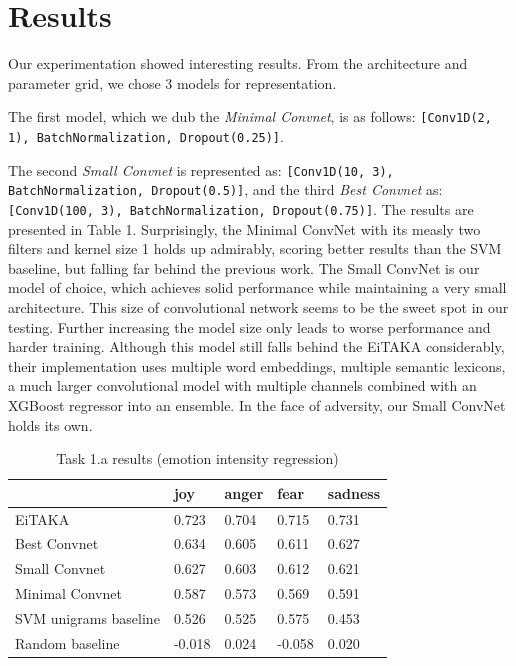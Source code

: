\documentclass[10pt, a4paper]{article}
\begin{document}

\section{Results}
Our experimentation showed interesting results. 
From the architecture and parameter grid, we chose 3 models for representation.

The first model, which we dub the \textit{Minimal Convnet}, is as follows:
\texttt{[Conv1D(2, 1), BatchNormalization, Dropout(0.25)]}.

The second \textit{Small Convnet} is represented as: 
\texttt{[Conv1D(10, 3), BatchNormalization, Dropout(0.5)]}, and the third 
\textit{Best Convnet} as: 
\texttt{[Conv1D(100, 3), BatchNormalization, Dropout(0.75)]}.
The results are presented in Table 1.
Surprisingly, the Minimal ConvNet with its measly two filters 
and kernel size 1 holds up admirably, scoring
better results than the SVM baseline, but falling far behind the 
previous work.
The Small ConvNet is our model of choice, which achieves solid 
performance while maintaining a very small architecture.
This size of convolutional network seems to be the sweet spot in our testing.
Further increasing the model size only leads to worse performance and 
harder training.
Although this model still falls behind the EiTAKA considerably, their
implementation uses multiple word embeddings, multiple semantic lexicons,
a much larger convolutional model with multiple channels combined with an
XGBoost regressor into an ensemble.
In the face of adversity, our Small ConvNet holds its own.


\begin{table}
\caption{Task 1.a results (emotion intensity regression)}
\label{tab:narrow-table}
\begin{center}
\begin{tabular}{lllll}
\toprule
& joy & anger & fear & sadness \\
\midrule
EiTAKA    & 0.723  & 0.704 & 0.715 & 0.731 \\
Best Convnet & 0.634 & 0.605 & 0.611 & 0.627 \\
Small Convnet & 0.627 & 0.603 & 0.612 & 0.621 \\
Minimal Convnet & 0.587 & 0.573 & 0.569 & 0.591 \\
SVM unigrams baseline & 0.526 & 0.525 & 0.575 & 0.453 \\
Random baseline & -0.018 & 0.024 & -0.058 & 0.020 \\
\bottomrule
\end{tabular}
\end{center}
\end{table}
\end{document}
